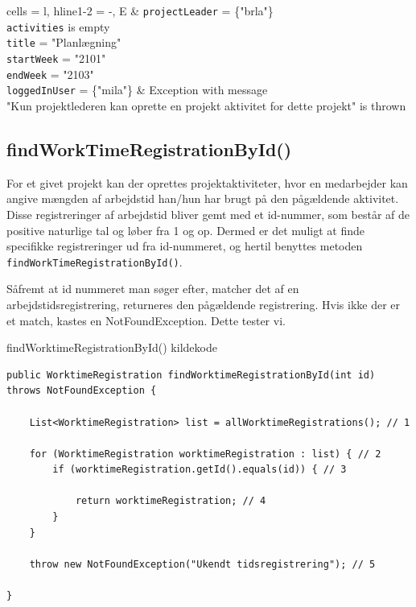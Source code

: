 \begin{table}[H]
\begin{tblr}{
  cells = {l},
  hline{1-2} = {-}{},
}
E & 
{
    \texttt{projectLeader} = \{"brla"\} \\
    \texttt{activities} is empty \\
    \texttt{title} = "Planlægning" \\
    \texttt{startWeek} = "2101" \\ 
    \texttt{endWeek} = "2103" \\
    \texttt{loggedInUser} = \{"mila"\}
} & 
{
    Exception with message \\ 
    "Kun projektlederen kan oprette en projekt aktivitet for dette projekt" is thrown
} \\

\end{tblr}
\end{table}

\subsection{findWorkTimeRegistrationById()} \label{sec:white_box_find_work_time}

For et givet projekt kan der oprettes projektaktiviteter, hvor en medarbejder kan angive mængden af arbejdstid han/hun har brugt på den pågældende aktivitet. Disse registreringer af arbejdstid bliver gemt med et id-nummer, som består af de positive naturlige tal og løber fra 1 og op. Dermed er det muligt at finde specifikke registreringer ud fra id-nummeret, og hertil benyttes metoden \texttt{findWorkTimeRegistrationById()}. 

Såfremt at id nummeret man søger efter, matcher det af en arbejdstidsregistrering, returneres den pågældende registrering. Hvis ikke der er et match, kastes en NotFoundException. Dette tester vi.

\begin{listing}[H]
    \centering
    \caption{findWorktimeRegistrationById() kildekode}\label{lst:find_work_time_registration_by_id_source_code}
    \begin{verbatim}
public WorktimeRegistration findWorktimeRegistrationById(int id) throws NotFoundException {
    
    List<WorktimeRegistration> list = allWorktimeRegistrations(); // 1

    for (WorktimeRegistration worktimeRegistration : list) { // 2
        if (worktimeRegistration.getId().equals(id)) { // 3
            
            return worktimeRegistration; // 4
        }
    }

    throw new NotFoundException("Ukendt tidsregistrering"); // 5

}
    \end{verbatim}
\end{listing}

